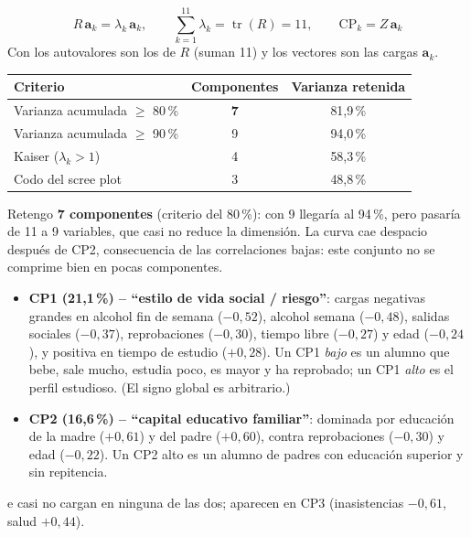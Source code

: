 \[
R\,\mathbf a_k=\lambda_k\,\mathbf a_k,\qquad \sum_{k=1}^{11}\lambda_k=\operatorname{tr}(R)=11,\qquad
\text{CP}_k=Z\,\mathbf a_k
\]
Con  los autovalores son los de $R$ (suman 11) y los vectores 
son las cargas $\mathbf a_k$.

\begin{center}\small
\begin{tabular}{lcc}
\toprule
Criterio & Componentes & Varianza retenida \\ \midrule
Varianza acumulada $\ge$ 80\,\% & \textbf{7} & 81,9\,\% \\
Varianza acumulada $\ge$ 90\,\% & 9 & 94,0\,\% \\
Kaiser ($\lambda_k>1$) & 4 & 58,3\,\% \\
Codo del scree plot & 3 & 48,8\,\% \\ \bottomrule
\end{tabular}
\end{center}
Retengo \textbf{7 componentes} (criterio del 80\,\%): con 9 llegaría al 94\,\%, pero pasaría de 11 a 9
variables, que casi no reduce la dimensión. La curva cae despacio después de CP2, consecuencia de las
correlaciones bajas: este conjunto no se comprime bien en pocas componentes.


\begin{itemize}[leftmargin=1.2em]
  \item[\color{cTeal}\faGlassCheers] \textbf{CP1 (21,1\,\%) -- ``estilo de vida social / riesgo''}: cargas
  negativas grandes en alcohol fin de semana ($-0,52$), alcohol semana ($-0,48$), salidas sociales ($-0,37$),
  reprobaciones ($-0,30$), tiempo libre ($-0,27$) y edad ($-0,24$), y positiva en tiempo de estudio ($+0,28$).
  Un CP1 \emph{bajo} es un alumno que bebe, sale mucho, estudia poco, es mayor y ha reprobado; un CP1
  \emph{alto} es el perfil estudioso. (El signo global es arbitrario.)
  \item[\color{cTeal}\faUserGraduate] \textbf{CP2 (16,6\,\%) -- ``capital educativo familiar''}: dominada por
  educación de la madre ($+0,61$) y del padre ($+0,60$), contra reprobaciones ($-0,30$) y edad ($-0,22$). Un
  CP2 alto es un alumno de padres con educación superior y sin repitencia.
\end{itemize}
 e  casi no cargan en ninguna de las dos; aparecen en CP3 (inasistencias
$-0,61$, salud $+0,44$).

